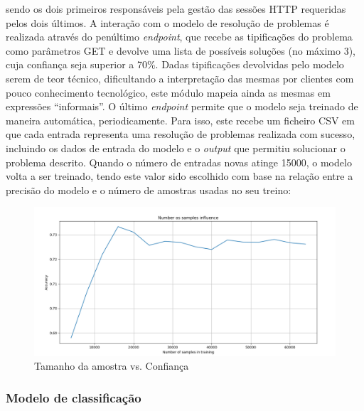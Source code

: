 \documentclass[11pt,a4paper]{article}
\begin{document}
sendo os dois primeiros responsáveis pela gestão das sessões HTTP requeridas pelos dois últimos. A interação
com o modelo de resolução de problemas é realizada através do penúltimo \textit{endpoint}, que recebe as
tipificações do problema como parâmetros GET e devolve uma lista de possíveis soluções (no máximo 3), cuja
confiança seja superior a 70\%. Dadas tipificações devolvidas pelo modelo serem de teor técnico,
dificultando a interpretação das mesmas por clientes com pouco conhecimento tecnológico, este módulo mapeia
ainda as mesmas em expressões ``informais''. O último \textit{endpoint} permite que o modelo seja treinado
de maneira automática, periodicamente. Para isso, este recebe um ficheiro CSV em que cada entrada
representa uma resolução de problemas realizada com sucesso, incluindo os dados de entrada do modelo e o
\textit{output} que permitiu solucionar o problema descrito. Quando o número de entradas novas atinge 15000,
o modelo volta a ser treinado, tendo este valor sido escolhido com base na relação entre a precisão do modelo e o
número de amostras usadas no seu treino:

\begin{figure}[H]
    \centering
    \includegraphics[width=13cm]{images/n_samples_influence.png}
    \caption{Tamanho da amostra vs. Confiança}
    \label{fig:sample_size_accuracy}
\end{figure}

\subsubsection{Modelo de classificação}
\end{document}
